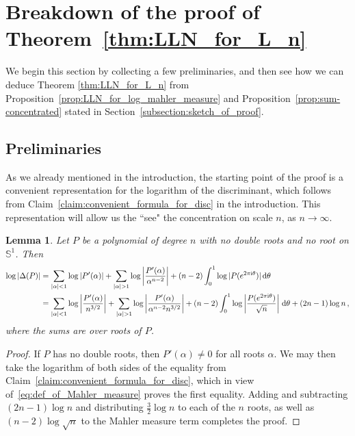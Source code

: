 \documentclass[11pt]{amsart}
\newtheorem{lemma}[theorem]{Lemma}
\theoremstyle{remark}
\theoremstyle{definition}
\newcommand{\bS}{\mathbb S}
\newcommand{\I}{{\rm i}}
\newcommand{\disc}{\Delta}
\begin{document}
    \section{Breakdown of the proof of Theorem~\ref{thm:LLN_for_L_n}}
    \label{sec:breakdown_of_the_proof}
    
    We begin this section by collecting a few preliminaries, and then see how we can deduce Theorem \ref{thm:LLN_for_L_n} from Proposition~\ref{prop:LLN_for_log_mahler_measure} and Proposition~\ref{prop:sum-concentrated} stated in Section~\ref{subsection:sketch_of_proof}.
    
    \subsection{Preliminaries}
    As we already mentioned in the introduction, the starting point of the proof is a convenient representation for the logarithm of the discriminant, which follows from Claim~\ref{claim:convenient_formula_for_disc} in the introduction. This representation will allow us the ``see" the concentration on scale $n$, as $n\to \infty$. 
     \begin{lemma}\label{lemma:expression_log_discriminant}
        Let $P$ be a polynomial of degree $n$ with no double roots and no root on $\bS^1$. Then \begin{align*}
            \log |\disc(P)| &=  \sum_{|\alpha| < 1} \log \left|P'(\alpha)\right| + \sum_{|\alpha| > 1} \log \left|\frac{P'(\alpha)}{\alpha^{n-2}}\right| + (n-2) \int_0^1 \log |P(e^{2\pi \I \theta})| \,{\rm d}\theta \\ 
            &= \sum_{|\alpha| < 1} \log \left|\frac{P'(\alpha)}{n^{3/2}}\right| + \sum_{|\alpha| > 1} \log \left|\frac{P'(\alpha)}{\alpha^{n-2} n^{3/2}}\right| + (n-2) \int_0^1 \log \left|\frac{P(e^{2\pi \I \theta})}{\sqrt{n}}\right| \,{\rm d}\theta  + (2n-1)\log n \, ,
        \end{align*}
        where the sums are over roots of $P$.
    \end{lemma}
    \begin{proof}
        If $P$ has no double roots, then $P'(\alpha) \neq 0$ for all roots $\alpha$.  We may then take the logarithm of both sides of the equality from Claim~\ref{claim:convenient_formula_for_disc}, which in view of~\eqref{eq:def_of_Mahler_measure} proves the first equality. Adding and subtracting $(2n - 1) \log n$ and distributing $\frac{3}{2}\log n$ to each of the $n$ roots, as well as $(n-2)\log\sqrt{n}$ to the Mahler measure term completes the proof.
    \end{proof}
\end{document}
